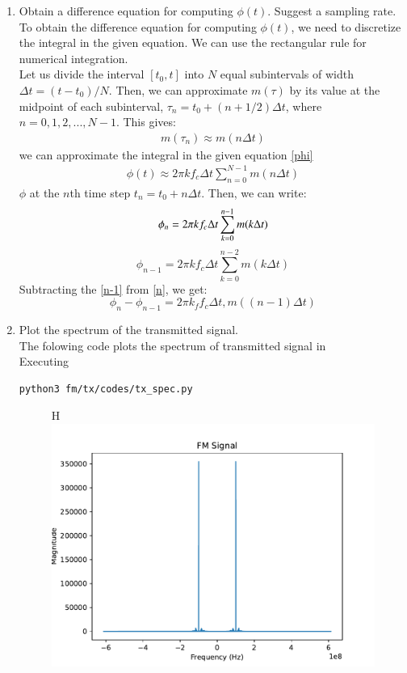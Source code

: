 \begin{enumerate}[label=\arabic*.,ref=\thesection.\theenumi]
\item Obtain a difference equation for computing $\phi(t)$.  Suggest a sampling rate.
\\
\solution 
\quad To obtain the difference equation for computing $\phi(t)$, we need to discretize the integral in the given equation. We can use the rectangular rule for numerical integration.\\ 
Let us divide the interval $[t_0, t]$ into $N$ equal subintervals of width $\Delta t = (t - t_0)/N$. Then, we can approximate $m(\tau)$ by its value at the midpoint of each subinterval, $\tau_n = t_0 + (n + 1/2)\Delta t$, where $n = 0, 1, 2, ..., N-1$. This gives:
\begin{align*}
m(\tau_n) \approx m(n\Delta t)
\end{align*}
we can approximate the integral in the given equation \ref{phi}
\begin{align*}
\phi(t) \approx 2\pi kf_c \Delta t \sum_{n=0}^{N-1} m(n\Delta t)
\end{align*}
$\phi$ at the $n$th time step $t_n = t_0 + n\Delta t$. Then, we can write:
\begin{equation}
\label{n}
\phi_n = 2\pi kf_c \Delta t \sum_{k=0}^{n-1} m(k\Delta t) \\
\end{equation}
\begin{equation}
\label{n-1}
\phi_{n-1} = 2\pi kf_c \Delta t \sum_{k=0}^{n-2} m(k\Delta t)
\end{equation}
Subtracting the \ref{n-1} from \ref{n}, we get:
\begin{equation}
\phi_n - \phi_{n-1} = 2\pi k_f f_c \Delta t, m((n-1)\Delta t)
\end{equation}
\item Plot the spectrum of the transmitted signal.
\\
\solution
The folowing code plots the spectrum of transmitted signal in 
\\
Executing
\begin{lstlisting}
python3 fm/tx/codes/tx_spec.py
\end{lstlisting}
\begin{figure}{H}
\centering	
\includegraphics[width=\columnwidth]{fm/tx/figs/tx_spec.pdf} 

\end{figure}
\end{enumerate}
